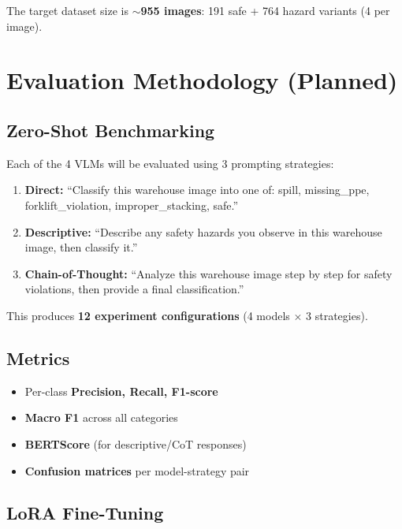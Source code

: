\documentclass[12pt, a4paper]{article}
\begin{document}
The target dataset size is \textbf{$\sim$955 images}: 191 safe + 764 hazard variants (4 per image).

\section{Evaluation Methodology (Planned)}

\subsection{Zero-Shot Benchmarking}

Each of the 4 VLMs will be evaluated using 3 prompting strategies:

\begin{enumerate}
    \item \textbf{Direct:} ``Classify this warehouse image into one of: spill, missing\_ppe, forklift\_violation, improper\_stacking, safe.''
    \item \textbf{Descriptive:} ``Describe any safety hazards you observe in this warehouse image, then classify it.''
    \item \textbf{Chain-of-Thought:} ``Analyze this warehouse image step by step for safety violations, then provide a final classification.''
\end{enumerate}

This produces \textbf{12 experiment configurations} (4 models $\times$ 3 strategies).

\subsection{Metrics}

\begin{itemize}
    \item Per-class \textbf{Precision, Recall, F1-score}
    \item \textbf{Macro F1} across all categories
    \item \textbf{BERTScore} (for descriptive/CoT responses)
    \item \textbf{Confusion matrices} per model-strategy pair
\end{itemize}

\subsection{LoRA Fine-Tuning}
\end{document}

